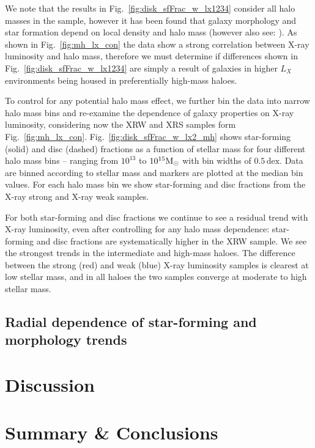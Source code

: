 We note that the results in Fig.~\ref{fig:disk_sfFrac_w_lx1234}
consider all halo masses in the sample, however it has been found that
galaxy morphology and star formation depend on local density and halo
mass \citep{dressler1980, balogh2004, wetzel2012, lackner2013}
(however also see: \citealt{delucia2012, hoyle2012, hou2013}).  As
shown in Fig.~\ref{fig:mh_lx_con} the data show a strong correlation
between X-ray luminosity and halo mass, therefore we must determine if
differences shown in Fig.~\ref{fig:disk_sfFrac_w_lx1234} are simply a
result of galaxies in higher $L_X$ environments being housed in
preferentially high-mass haloes.
\par
To control for any potential halo mass effect, we further bin the data
into narrow halo mass bins and re-examine the dependence of galaxy
properties on X-ray luminosity, considering now the XRW and XRS
samples form Fig.~\ref{fig:mh_lx_con}.
Fig.~\ref{fig:disk_sfFrac_w_lx2_mh} shows star-forming (solid) and
disc (dashed) fractions as a function of stellar mass for four
different halo mass bins -- ranging from $10^{13}$ to $10^{15}\mathrm{M_{\odot}}$
with bin widths of $0.5\,\mathrm{dex}$.  Data are binned according to
stellar mass and markers are plotted at the median bin values.  For
each halo mass bin we show star-forming and disc fractions from the
X-ray strong and X-ray weak samples.
\par
For both star-forming and disc fractions we continue to see a residual
trend with X-ray luminosity, even after controlling for any halo mass
dependence: star-forming and disc fractions are systematically higher
in the XRW sample.  We see the strongest trends in the intermediate
and high-mass haloes.  The difference between the strong (red) and
weak (blue) X-ray luminosity samples is clearest at low stellar mass,
and in all haloes the two samples converge at moderate to high stellar
mass.

\subsection{Radial dependence of star-forming and morphology trends}

\section{Discussion}
\label{sec:discussion_x}

\section{Summary \& Conclusions}
\label{sec:conclusions_x}

%


